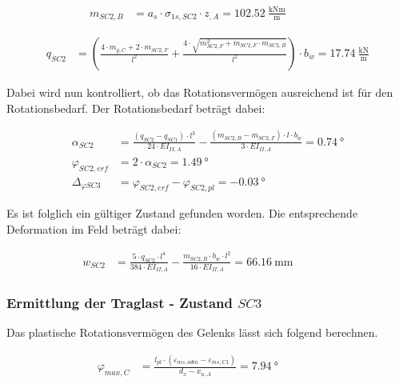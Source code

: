 \documentclass[
  11pt,
  letterpaper,
]{scrreprt}
\begin{document}
\[
\begin{aligned}
m_{SC2 , B}& = a_{s} \cdot \sigma_{1 s , SC2} \cdot z_{, A} = 102.52 \ \frac{\mathrm{kNm}}{\mathrm{m}} \quad &  \quad &  
 \end{aligned}
\]

\[
\begin{aligned}
q_{SC2}& = \left(\frac{4 \cdot m_{y , C} + 2 \cdot m_{SC2 , F}}{l^{2}} + \frac{4 \cdot \sqrt{m_{SC2 , F}^{2} + m_{SC2 , F} \cdot m_{SC2 , B}}}{l^{2}}\right) \cdot b_{w} = 17.74 \ \frac{\mathrm{kN}}{\mathrm{m}} \end{aligned}
\]

Dabei wird nun kontrolliert, ob das Rotationsvermögen ausreichend ist
für den Rotationsbedarf. Der Rotationsbedarf beträgt dabei:

\[
\begin{aligned}
\alpha_{SC2}& = \frac{\left(q_{SC2} - q_{SC1}\right) \cdot l^{3}}{24 \cdot EI_{II , A}} - \frac{\left(m_{SC2 , B} - m_{SC2 , F}\right) \cdot l \cdot b_{w}}{3 \cdot EI_{II , A}} = 0.74 \ \mathrm{°} \\ 
\varphi_{SC2 , erf}& = 2 \cdot \alpha_{SC2} = 1.49 \ \mathrm{°} \\ 
\Delta_{\varphi SC3}& = \varphi_{SC2 , erf} - \varphi_{SC2 , pl} = -0.03 \ \mathrm{°} \end{aligned}
\]

Es ist folglich ein gültiger Zustand gefunden worden. Die entsprechende
Deformation im Feld beträgt dabei:

\[
\begin{aligned}
w_{SC2}& = \frac{5 \cdot q_{SC2} \cdot l^{4}}{384 \cdot EI_{II , A}} - \frac{m_{SC2 , B} \cdot b_{w} \cdot l^{2}}{16 \cdot EI_{II , A}} = 66.16 \ \mathrm{mm} \quad &  \quad &  
 \end{aligned}
\]

\subsubsection{\texorpdfstring{Ermittlung der Traglast - Zustand
\(SC3\)}{Ermittlung der Traglast - Zustand SC3}}\label{ermittlung-der-traglast---zustand-sc3}

Das plastische Rotationsvermögen des Gelenks lässt sich folgend
berechnen.

\[
\begin{aligned}
\varphi_{max , C}& = \frac{l_{pl} \cdot \left(\varepsilon_{m s , adm} - \varepsilon_{m s , C1}\right)}{d_{x} - x_{u , A}} = 7.94 \ \mathrm{°} \quad &  \quad &  
 \end{aligned}
\]
\end{document}
